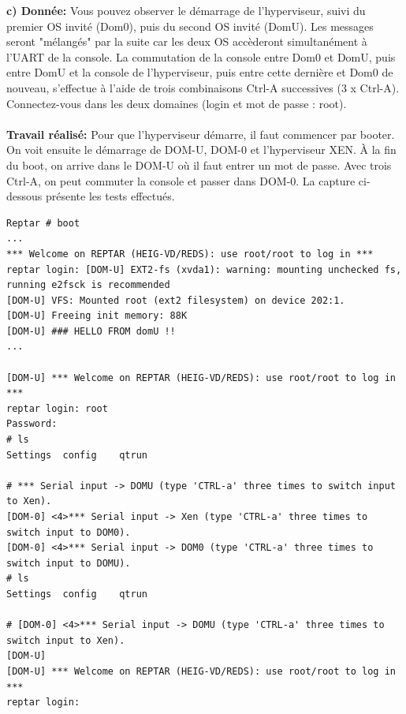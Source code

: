 \textbf{c) Donnée: }Vous pouvez observer le démarrage de l'hyperviseur, suivi du premier OS invité (Dom0), puis du
second OS invité (DomU). Les messages seront "mélangés" par la suite car les deux OS accèderont
simultanément à l'UART de la console. La commutation de la console entre Dom0 et DomU, puis
entre DomU et la console de l'hyperviseur, puis entre cette dernière et Dom0 de nouveau, s'effectue
à l'aide de trois combinaisons Ctrl-A successives (3 x Ctrl-A). Connectez-vous dans les deux
domaines (login et mot de passe : root).\\\\
\textbf{Travail réalisé: }Pour que l'hyperviseur démarre, il faut commencer par booter. On voit ensuite le démarrage de DOM-U, DOM-0 et l'hyperviseur XEN. À la fin du boot, on arrive dans le DOM-U où il faut entrer un mot de passe. Avec trois Ctrl-A, on peut commuter la console et passer dans DOM-0. La capture ci-dessous présente les tests effectués. 
\begin{lstlisting}
Reptar # boot
...
*** Welcome on REPTAR (HEIG-VD/REDS): use root/root to log in ***
reptar login: [DOM-U] EXT2-fs (xvda1): warning: mounting unchecked fs, running e2fsck is recommended
[DOM-U] VFS: Mounted root (ext2 filesystem) on device 202:1.
[DOM-U] Freeing init memory: 88K
[DOM-U] ### HELLO FROM domU !!
...

[DOM-U] *** Welcome on REPTAR (HEIG-VD/REDS): use root/root to log in ***
reptar login: root
Password: 
# ls
Settings  config    qtrun

# *** Serial input -> DOMU (type 'CTRL-a' three times to switch input to Xen).
[DOM-0] <4>*** Serial input -> Xen (type 'CTRL-a' three times to switch input to DOM0).
[DOM-0] <4>*** Serial input -> DOM0 (type 'CTRL-a' three times to switch input to DOMU).
# ls
Settings  config    qtrun

# [DOM-0] <4>*** Serial input -> DOMU (type 'CTRL-a' three times to switch input to Xen).
[DOM-U] 
[DOM-U] *** Welcome on REPTAR (HEIG-VD/REDS): use root/root to log in ***
reptar login: 
\end{lstlisting}
